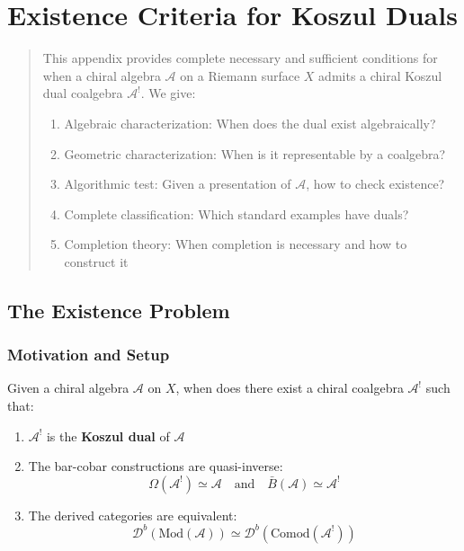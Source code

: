 
\chapter{Existence Criteria for Koszul Duals}
\label{app:existence-criteria}

\begin{abstract}
This appendix provides complete necessary and sufficient conditions for when a 
chiral algebra $\mathcal{A}$ on a Riemann surface $X$ admits a chiral Koszul dual 
coalgebra $\mathcal{A}^!$. We give:
\begin{enumerate}
\item Algebraic characterization: When does the dual exist algebraically?
\item Geometric characterization: When is it representable by a coalgebra?
\item Algorithmic test: Given a presentation of $\mathcal{A}$, how to check existence?
\item Complete classification: Which standard examples have duals?
\item Completion theory: When completion is necessary and how to construct it
\end{enumerate}
\end{abstract}


\section{The Existence Problem}
\label{sec:existence-problem-statement}

\subsection{Motivation and Setup}

\begin{question}\label{q:existence-central}
Given a chiral algebra $\mathcal{A}$ on $X$, when does there exist a chiral 
coalgebra $\mathcal{A}^!$ such that:
\begin{enumerate}
\item $\mathcal{A}^!$ is the \textbf{Koszul dual} of $\mathcal{A}$
\item The bar-cobar constructions are quasi-inverse:
      $$\Omega(\mathcal{A}^!) \simeq \mathcal{A} \quad \text{and} \quad 
      \bar{B}(\mathcal{A}) \simeq \mathcal{A}^!$$
\item The derived categories are equivalent:
      $$\mathcal{D}^b(\text{Mod}(\mathcal{A})) \simeq 
      \mathcal{D}^b(\text{Comod}(\mathcal{A}^!))$$
\end{enumerate}
\end{question}


